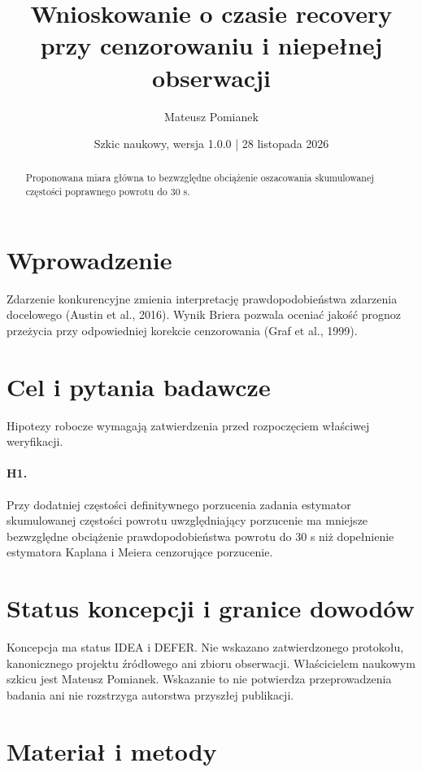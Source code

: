 \documentclass[11pt,a4paper]{article}
\title{Wnioskowanie o czasie recovery przy cenzorowaniu i niepełnej obserwacji}
\author{Mateusz Pomianek}
\date{Szkic naukowy, wersja 1.0.0 | 28 listopada 2026}
\begin{document}
\maketitle

\begin{abstract}

Proponowana miara główna to bezwzględne obciążenie oszacowania skumulowanej częstości poprawnego powrotu do 30 s.

\end{abstract}

\section{Wprowadzenie}

Zdarzenie konkurencyjne zmienia interpretację prawdopodobieństwa zdarzenia docelowego (Austin et al., 2016). Wynik Briera pozwala oceniać jakość prognoz przeżycia przy odpowiedniej korekcie cenzorowania (Graf et al., 1999).

\section{Cel i pytania badawcze}

Hipotezy robocze wymagają zatwierdzenia przed rozpoczęciem właściwej weryfikacji.

\paragraph{H1.} Przy dodatniej częstości definitywnego porzucenia zadania estymator skumulowanej częstości powrotu uwzględniający porzucenie ma mniejsze bezwzględne obciążenie prawdopodobieństwa powrotu do 30 s niż dopełnienie estymatora Kaplana i Meiera cenzorujące porzucenie.

\section{Status koncepcji i granice dowodów}

Koncepcja ma status IDEA i DEFER. Nie wskazano zatwierdzonego protokołu, kanonicznego projektu źródłowego ani zbioru obserwacji. Właścicielem naukowym szkicu jest Mateusz Pomianek. Wskazanie to nie potwierdza przeprowadzenia badania ani nie rozstrzyga autorstwa przyszłej publikacji.

\section{Materiał i metody}
\end{document}
